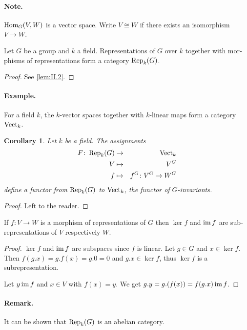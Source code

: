 \documentclass[12pt,a4paper]{scrartcl}
\theoremstyle{cplain}
\newtheorem{cor}[thmcounter]{Corollary}
\theoremstyle{cplain}
\theoremstyle{cplain}
\theoremstyle{definition}
\begin{document}
\begin{otherlanguage}{english}
\paragraph{Note.} $\operatorname{Hom}_G(V,W)$ is a vector space. Write $V \cong W$ if there exists an isomorphism $V \to W$.

\begin{lem}
  Let $G$ be a group and $k$ a field. Representations of $G$ over $k$ together with morphisms of representations  form a category $\operatorname{Rep}_k(G)$.
\end{lem}
\begin{proof}
  See \cref{lem:II.2}.
\end{proof}

\paragraph{Example.} For a field $k$, the $k$-vector spaces together with $k$-linear maps form a category $\operatorname{Vect}_k$.

\begin{cor}
  Let $k$ be a field. The assignments
  \begin{eqnarray*}
    F \colon \operatorname{Rep}_k(G) &\to& \operatorname{Vect}_k\\
    V &\mapsto& V^G \\
    f &\mapsto& f^G\colon V^G \to W^G
  \end{eqnarray*}
  define a functor from $\operatorname{Rep}_k(G)$ to $\operatorname{Vect}_k$, the functor of $G$-invariants.
\end{cor}
\begin{proof}
  Left to the reader.
\end{proof}

\begin{lem} \label{lem:II.5}
  If $f\colon V \to W$ is a morphism of representations of $G$ then $\ker f$ and $\operatorname{im} f$ are subrepresentations of $V$ respectively $W$.
\end{lem}
\begin{proof}
  $\ker f$ and $\operatorname{im} f $ are subspaces since $f$ is linear. Let $g \in G$ and $x \in\ker f$. Then $f(g.x) = g.f(x) = g.0 = 0$ and $g.x \in \ker f$, thus $\ker f $ is a subrepresentation.
  
  Let $y \operatorname{im} f$ and $x \in V$ with $f(x) = y$. We get $g.y = g.(f(x)) = f(g.x) \operatorname{im} f$.
\end{proof}

\paragraph{Remark.} It can be shown that $\operatorname{Rep}_k(G)$ is an abelian category.


\end{otherlanguage}
\end{document}
